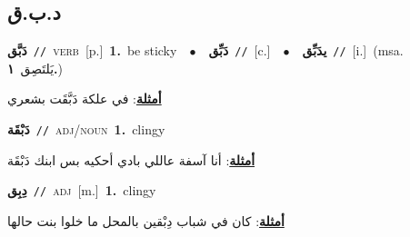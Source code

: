 \documentclass[10pt,a4paper,twoside]{article} %
\begin{document}
\begin{multicols}{2}
\vspace{-3mm}
\subsection*{\color{blue}\foreignlanguage{arabic}{د.ب.ق}\color{blue}{}} 

{\setlength\topsep{0pt}\textbf{\foreignlanguage{arabic}{دَبَّق}}\ {\color{gray}\texttt{//}\color{black}}\ \textsc{verb}\ [p.]\ \textbf{1.}~be sticky\ \ $\bullet$\ \ \setlength\topsep{0pt}\textbf{\foreignlanguage{arabic}{دَبِّق}}\ {\color{gray}\texttt{//}\color{black}}\ [c.]\ \ $\bullet$\ \ \setlength\topsep{0pt}\textbf{\foreignlanguage{arabic}{يدَبِّق}}\ {\color{gray}\texttt{//}\color{black}}\ [i.]\ \color{gray}(msa. \foreignlanguage{arabic}{يَلتَصِق}~\foreignlanguage{arabic}{\textbf{١.}})\color{black}\  \begin{flushright}\color{gray}\foreignlanguage{arabic}{\textbf{\underline{\foreignlanguage{arabic}{أمثلة}}}: في علكة دَبَّقَت بشعري}\end{flushright}\color{black}} \vspace{2mm}

{\setlength\topsep{0pt}\textbf{\foreignlanguage{arabic}{دَبْقَة}}\ {\color{gray}\texttt{//}\color{black}}\ \textsc{adj/noun}\ \textbf{1.}~clingy\  \begin{flushright}\color{gray}\foreignlanguage{arabic}{\textbf{\underline{\foreignlanguage{arabic}{أمثلة}}}: أنا آسفة عاللي بادي أحكيه بس ابنك دَبْقَة}\end{flushright}\color{black}} \vspace{2mm}

{\setlength\topsep{0pt}\textbf{\foreignlanguage{arabic}{دِبِق}}\ {\color{gray}\texttt{//}\color{black}}\ \textsc{adj}\ [m.]\ \textbf{1.}~clingy\  \begin{flushright}\color{gray}\foreignlanguage{arabic}{\textbf{\underline{\foreignlanguage{arabic}{أمثلة}}}: كان في شباب دِبْقين بالمحل ما خلوا بنت حالها}\end{flushright}\color{black}} \vspace{2mm}


\end{multicols}
\end{document}
